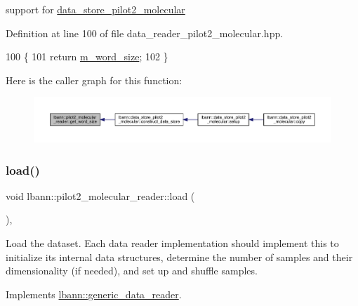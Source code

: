 support for \hyperlink{classlbann_1_1data__store__pilot2__molecular}{data\+\_\+store\+\_\+pilot2\+\_\+molecular} 



Definition at line 100 of file data\+\_\+reader\+\_\+pilot2\+\_\+molecular.\+hpp.


\begin{DoxyCode}
100                             \{
101     \textcolor{keywordflow}{return} \hyperlink{classlbann_1_1pilot2__molecular__reader_a1093a0518b7913c91e9b36679b198948}{m\_word\_size};
102   \}
\end{DoxyCode}
Here is the caller graph for this function\+:\nopagebreak
\begin{figure}[H]
\begin{center}
\leavevmode
\includegraphics[width=350pt]{classlbann_1_1pilot2__molecular__reader_abba5a68c484be69a441e5e9711356a46_icgraph}
\end{center}
\end{figure}
\mbox{\label{classlbann_1_1pilot2__molecular__reader_a1b5160021a532f5f19897bd2250e3a46}} 
\subsubsection{\texorpdfstring{load()}{load()}}
{\footnotesize\ttfamily void lbann\+::pilot2\+\_\+molecular\+\_\+reader\+::load (\begin{DoxyParamCaption}{ }\end{DoxyParamCaption})\hspace{0.3cm}{\ttfamily [override]}, {\ttfamily [virtual]}}

Load the dataset. Each data reader implementation should implement this to initialize its internal data structures, determine the number of samples and their dimensionality (if needed), and set up and shuffle samples. 

Implements \hyperlink{classlbann_1_1generic__data__reader_afeb47703d988a230a59859cbfc178215}{lbann\+::generic\+\_\+data\+\_\+reader}.



